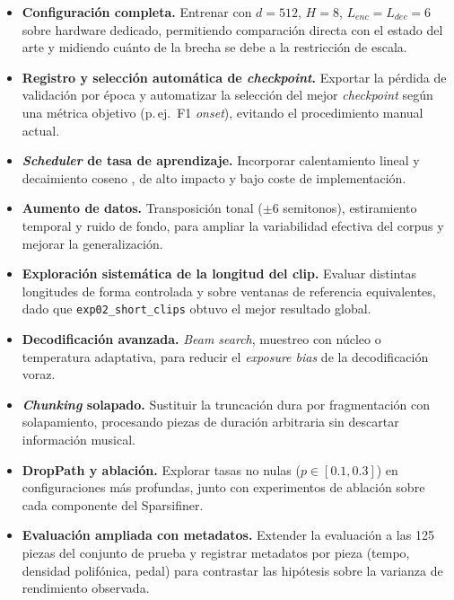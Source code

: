 \begin{itemize}
    \item \textbf{Configuración completa.} Entrenar con $d=512$,
    $H=8$, $L_{enc}=L_{dec}=6$ sobre hardware dedicado, permitiendo
    comparación directa con el estado del arte y midiendo cuánto de
    la brecha se debe a la restricción de escala.

    \item \textbf{Registro y selección automática de
    \textit{checkpoint}.} Exportar la pérdida de validación por época
    y automatizar la selección del mejor \textit{checkpoint} según
    una métrica objetivo (p.\,ej.\ F1 \textit{onset}), evitando el
    procedimiento manual actual.

    \item \textbf{\textit{Scheduler} de tasa de aprendizaje.}
    Incorporar calentamiento lineal y decaimiento coseno
    \cite{vaswani2017attention}, de alto impacto y bajo coste de
    implementación.

    \item \textbf{Aumento de datos.} Transposición tonal
    ($\pm 6$ semitonos), estiramiento temporal y ruido de fondo, para
    ampliar la variabilidad efectiva del corpus y mejorar la
    generalización.

    \item \textbf{Exploración sistemática de la longitud del clip.}
    Evaluar distintas longitudes de forma controlada y sobre ventanas
    de referencia equivalentes, dado que \newline\texttt{exp02\_short\_clips}
    obtuvo el mejor resultado global.

    \item \textbf{Decodificación avanzada.} \textit{Beam search},
    muestreo con núcleo o temperatura adaptativa, para reducir el
    \textit{exposure bias} de la decodificación voraz.

    \item \textbf{\textit{Chunking} solapado.} Sustituir la
    truncación dura por fragmentación con solapamiento, procesando
    piezas de duración arbitraria sin descartar información musical.

    \item \textbf{DropPath y ablación.} Explorar tasas no nulas
    ($p \in [0.1, 0.3]$) en configuraciones más profundas, junto con
    experimentos de ablación sobre cada componente del Sparsifiner.

    \item \textbf{Evaluación ampliada con metadatos.} Extender la
    evaluación a las 125 piezas del conjunto de prueba y registrar
    metadatos por pieza (tempo, densidad polifónica, pedal) para
    contrastar las hipótesis sobre la varianza de rendimiento
    observada.


\end{itemize}
